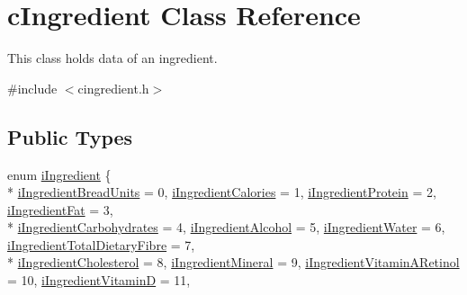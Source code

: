 \hypertarget{classc_ingredient}{}\section{c\+Ingredient Class Reference}
\label{classc_ingredient}


This class holds data of an ingredient.  




{\ttfamily \#include $<$cingredient.\+h$>$}

\subsection*{Public Types}
\begin{DoxyCompactItemize}
\item 
enum \hyperlink{classc_ingredient_acf023723841ec66cd6368a25e3174a28}{i\+Ingredient} \{ \\*
\hyperlink{classc_ingredient_acf023723841ec66cd6368a25e3174a28ab889d4026db11760a8e057c915273a53}{i\+Ingredient\+Bread\+Units} = 0, 
\hyperlink{classc_ingredient_acf023723841ec66cd6368a25e3174a28a910139fbdcbe825cbd17ab1f8d98bda1}{i\+Ingredient\+Calories} = 1, 
\hyperlink{classc_ingredient_acf023723841ec66cd6368a25e3174a28ac3f49bc5d113ba83ea943fe3a31265f7}{i\+Ingredient\+Protein} = 2, 
\hyperlink{classc_ingredient_acf023723841ec66cd6368a25e3174a28a9a2354be9de0652de3c6bb1ae7a33a93}{i\+Ingredient\+Fat} = 3, 
\\*
\hyperlink{classc_ingredient_acf023723841ec66cd6368a25e3174a28a35bb83890a3eb685973a8707315508df}{i\+Ingredient\+Carbohydrates} = 4, 
\hyperlink{classc_ingredient_acf023723841ec66cd6368a25e3174a28afcb5c053eb33e8e56a5b3bf127532647}{i\+Ingredient\+Alcohol} = 5, 
\hyperlink{classc_ingredient_acf023723841ec66cd6368a25e3174a28a0f72bda1254d2141e405950d9dcade7b}{i\+Ingredient\+Water} = 6, 
\hyperlink{classc_ingredient_acf023723841ec66cd6368a25e3174a28af59a88854cae0b1af5fcd2b570d2dd13}{i\+Ingredient\+Total\+Dietary\+Fibre} = 7, 
\\*
\hyperlink{classc_ingredient_acf023723841ec66cd6368a25e3174a28a7ec96f96b0f551c1d230179b25616049}{i\+Ingredient\+Cholesterol} = 8, 
\hyperlink{classc_ingredient_acf023723841ec66cd6368a25e3174a28a76a0f875f665179f0fd36721e9efddbd}{i\+Ingredient\+Mineral} = 9, 
\hyperlink{classc_ingredient_acf023723841ec66cd6368a25e3174a28a4b16ea58a637ce7b240ab9ad8b6d68a7}{i\+Ingredient\+Vitamin\+A\+Retinol} = 10, 
\hyperlink{classc_ingredient_acf023723841ec66cd6368a25e3174a28a70b8df3c383ad6e9e061bef56c83f8c8}{i\+Ingredient\+VitaminD} = 11, 

\end{DoxyCompactItemize}
